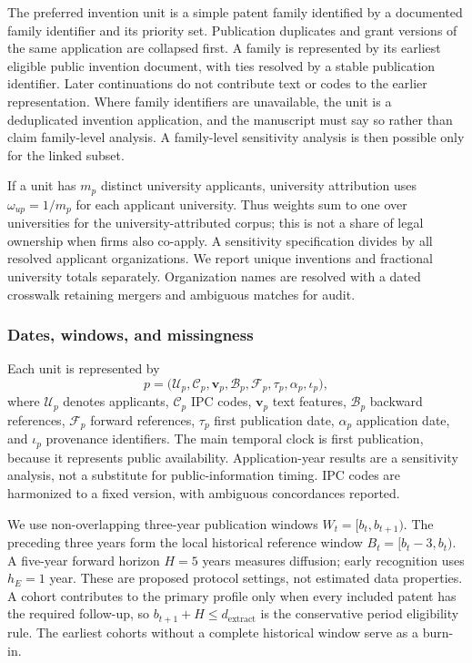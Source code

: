 The preferred invention unit is a simple patent family identified by a documented
family identifier and its priority set. Publication duplicates and grant versions
of the same application are collapsed first. A family is represented by its
earliest eligible public invention document, with ties resolved by a stable
publication identifier. Later continuations do not contribute text or codes to
the earlier representation. Where family identifiers are unavailable, the unit
is a deduplicated invention application, and the manuscript must say so rather
than claim family-level analysis. A family-level sensitivity analysis is then
possible only for the linked subset.



If a unit has $m_p$ distinct university applicants, university attribution uses
$\omega_{up}=1/m_p$ for each applicant university. Thus weights sum to one over
universities for the university-attributed corpus; this is not a share of legal
ownership when firms also co-apply. A sensitivity specification divides by all
resolved applicant organizations. We report unique inventions and fractional
university totals separately. Organization names are resolved with a dated
crosswalk retaining mergers and ambiguous matches for audit.

\subsubsection{Dates, windows, and missingness}
Each unit is represented by
\begin{equation}
 p=\bigl(\mathcal{U}_p,\mathcal{C}_p,\mathbf{v}_p,
          \mathcal{B}_p,\mathcal{F}_p,\tau_p,\alpha_p,\iota_p\bigr),
\end{equation}
where $\mathcal{U}_p$ denotes applicants, $\mathcal{C}_p$ IPC codes,
$\mathbf{v}_p$ text features, $\mathcal{B}_p$ backward references,
$\mathcal{F}_p$ forward references, $\tau_p$ first publication date,
$\alpha_p$ application date, and $\iota_p$ provenance identifiers.
The main temporal clock is first publication, because it represents public
availability. Application-year results are a sensitivity analysis, not a
substitute for public-information timing. IPC codes are harmonized to a fixed
version, with ambiguous concordances reported.

We use non-overlapping three-year publication windows $W_t=[b_t,b_{t+1})$.
The preceding three years form the local historical reference window
$B_t=[b_t-3,b_t)$. A five-year forward horizon $H=5$ years measures diffusion;
early recognition uses $h_E=1$ year. These are proposed protocol settings,
not estimated data properties. A cohort contributes to the primary profile only
when every included patent has the required follow-up, so
$b_{t+1}+H\leq d_{\mathrm{extract}}$ is the conservative period eligibility rule.
The earliest cohorts without a complete historical window serve as a burn-in.

